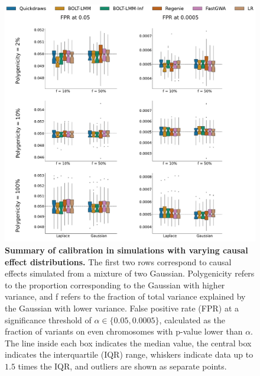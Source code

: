 \begin{figure}[h!]
    \centering
    \includegraphics[width=\textwidth]{figures/sim_calibration/mog_fpr.pdf}
    \caption{
    \textbf{Summary of calibration in simulations with varying causal effect distributions.}
    The first two rows correspond to causal effects simulated from a mixture of two Gaussian. 
    Polygenicity refers to the proportion corresponding to the Gaussian with higher variance, and f refers to the fraction of total variance explained by the Gaussian with lower variance.
    False positive rate (FPR) at a significance threshold of $\alpha \in \{0.05, 0.0005\}$, calculated as the fraction of variants on even chromosomes with p-value lower than $\alpha$.
    The line inside each box indicates the median value, the central box indicates the interquartile (IQR) range, whiskers indicate data up to $1.5$ times the IQR, and outliers are shown as separate points.
    \label{fig:sim_calib_mog}
    }
\end{figure}


